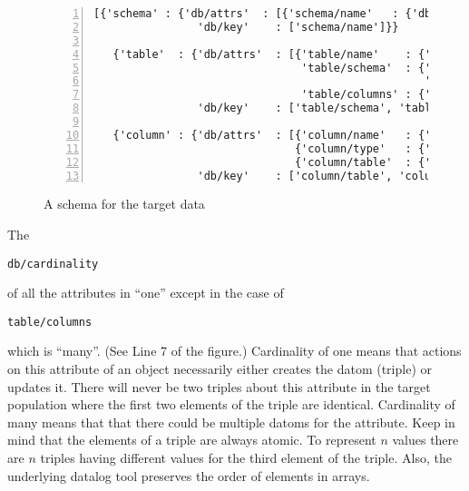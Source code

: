 \documentclass[9pt,letterpaper]{article}
\newcommand{\stt}[1]{\begin{footnotesize}\texttt{#1}\end{footnotesize}}
\begin{document}

\begin{figure}[H]
  \caption{A schema for the target data}
  \label{code:example-schema-1}
\begin{lstlisting}[numberstyle=\scriptsize,basicstyle=\ttfamily\scriptsize,numbers=left,stepnumber=1,breaklines=true]
  [{'schema' : {'db/attrs'  : [{'schema/name'   : {'db/type' : 'string', 'db/cardinality' : 'one'}}],
                'db/key'    : ['schema/name']}}

   {'table'  : {'db/attrs'  : [{'table/name'    : {'db/type' : 'string', 'db/cardinality' : 'one' },
                                'table/schema'  : {'db/type' : 'object', 'db/cardinality' : 'one',
                                                   'db/in-line?' : true},
                                'table/columns' : {'db/type' : 'object', 'db/cardinality' : 'many'}}],
                'db/key'    : ['table/schema', 'table/name']}}

   {'column' : {'db/attrs'  : [{'column/name'   : {'db/type' : 'string', 'db/cardinality' : 'one'}},
                               {'column/type'   : {'db/type' : 'string', 'db/cardinality' : 'one'}},
                               {'column/table'  : {'db/type' : 'object', 'db/cardinality' : 'one'}}],
                'db/key'    : ['column/table', 'column/name']}}]
\end{lstlisting}
\end{figure}

The \stt{db/cardinality} of all the attributes in ``one'' except in the case of \stt{table/columns} which is ``many''.
(See Line 7 of the figure.)
Cardinality of one means that actions on this attribute of an object necessarily either creates the datom (triple) or updates it.
There will never be two triples about this attribute in the target population where the first two elements of the triple are identical.
Cardinality of many means that that there could be multiple datoms for the attribute.
Keep in mind that the elements of a triple are always atomic.
To represent $n$ values there are $n$ triples having different values for the third element of the triple.
Also, the underlying datalog tool preserves the order of elements in arrays.
\end{document}
